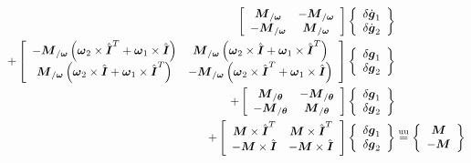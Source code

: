 \documentclass[10pt,dvips,fleqn]{report}
\newcommand{\T}[1]{\boldsymbol{#1}}
\newcommand{\equu}{\overset{\mathrm{uu}}{=}}
\begin{document}
\begin{align}
	\sqbr{\matr{cc}{
		\T{M}_{/\T{\omega}} & - \T{M}_{/\T{\omega}} \\
		- \T{M}_{/\T{\omega}} & \T{M}_{/\T{\omega}}
	}} \cubr{\cvvect{
		\delta\dot{\T{g}}_1 \\
		\delta\dot{\T{g}}_2
	}} & \nonumber \\
	+ \sqbr{\matr{cc}{
		- \T{M}_{/\T{\omega}} \plbr{\T{\omega}_2 \times \hat{\T{I}}^T + \T{\omega}_1\times \hat{\T{I}}}
			& \T{M}_{/\T{\omega}} \plbr{\T{\omega}_2 \times \hat{\T{I}} + \T{\omega}_1\times \hat{\T{I}}^T} \\
		\T{M}_{/\T{\omega}} \plbr{\T{\omega}_2\times \hat{\T{I}} + \T{\omega}_1\times \hat{\T{I}}^T}
			& - \T{M}_{/\T{\omega}} \plbr{\T{\omega}_2 \times \hat{\T{I}}^T + \T{\omega}_1\times \hat{\T{I}}}
	}} \cubr{\cvvect{
		\delta\T{g}_1 \\
		\delta\T{g}_2
	}} & \nonumber \\
	+ \sqbr{\matr{cc}{
		\T{M}_{/\T{\theta}} & - \T{M}_{/\T{\theta}} \\
		- \T{M}_{/\T{\theta}} & \T{M}_{/\T{\theta}}
	}} \cubr{\cvvect{
		\delta\T{g}_1 \\
		\delta\T{g}_2
	}} & \nonumber \\
	+ \sqbr{\matr{cc}{
		\T{M} \times \hat{\T{I}}^T & \T{M} \times \hat{\T{I}}^T \\
		- \T{M} \times \hat{\T{I}} & - \T{M} \times \hat{\T{I}}
	}} \cubr{\cvvect{
		\delta\T{g}_1 \\
		\delta\T{g}_2
	}} &\equu \cubr{\cvvect{
		\T{M} \\
		- \T{M}
	}}
\end{align}
\end{document}
